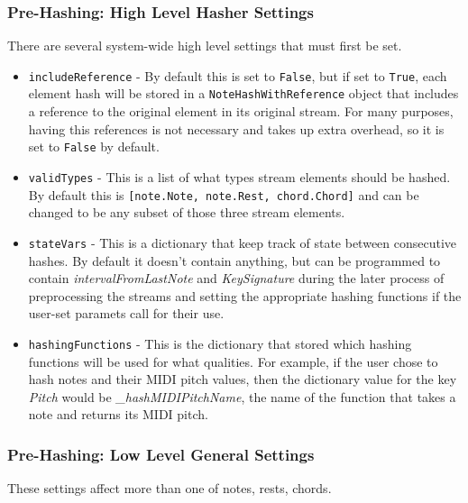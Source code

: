 \subsubsection{Pre-Hashing: High Level Hasher Settings}
There are several system-wide high level settings that must first be set.
\begin{itemize}
\item \texttt{includeReference} - By default this is set to \texttt{False}, but if set to \texttt{True}, each element hash will be stored in a \texttt{NoteHashWithReference} object that includes a reference to the original element in its original stream. For many purposes, having this references is not necessary and takes up extra overhead, so it is set to \texttt{False} by default.

\item \texttt{validTypes} - This is a list of what types stream elements should be hashed. By default this is \texttt{[note.Note, note.Rest, chord.Chord]} and can be changed to be any subset of those three stream elements.
\item \texttt{stateVars} - This is a dictionary that keep track of state between consecutive hashes. By default it doesn't contain anything, but can be programmed to contain \textit{intervalFromLastNote} and \textit{KeySignature} during the later process of preprocessing the streams and setting the appropriate hashing functions if the user-set paramets call for their use. 

\item \texttt{hashingFunctions} - This is the dictionary that stored which hashing functions will be used for what qualities. For example, if the user chose to hash notes and their MIDI pitch values, then the dictionary value for the key \textit{Pitch} would be \textit{\_hashMIDIPitchName}, the name of the function that takes a note and returns its MIDI pitch. 
\end{itemize}

        \subsubsection{Pre-Hashing: Low Level General Settings}
        These settings affect more than one of notes, rests, chords.
        
